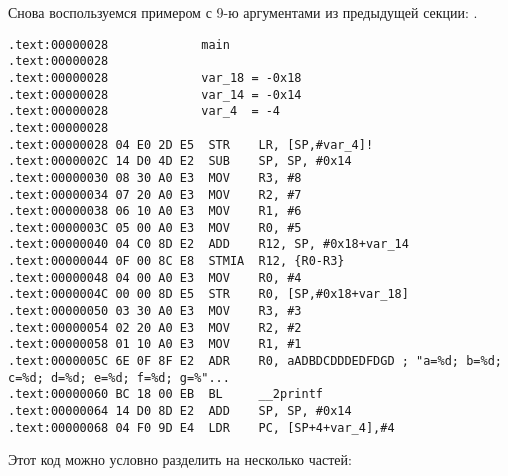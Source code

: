 
Снова воспользуемся примером с 9-ю аргументами из предыдущей секции: .



\subsubsectionold{\OptimizingKeilVI: \ARMMode}

\begin{lstlisting}
.text:00000028             main
.text:00000028
.text:00000028             var_18 = -0x18
.text:00000028             var_14 = -0x14
.text:00000028             var_4  = -4
.text:00000028
.text:00000028 04 E0 2D E5  STR    LR, [SP,#var_4]!
.text:0000002C 14 D0 4D E2  SUB    SP, SP, #0x14
.text:00000030 08 30 A0 E3  MOV    R3, #8
.text:00000034 07 20 A0 E3  MOV    R2, #7
.text:00000038 06 10 A0 E3  MOV    R1, #6
.text:0000003C 05 00 A0 E3  MOV    R0, #5
.text:00000040 04 C0 8D E2  ADD    R12, SP, #0x18+var_14
.text:00000044 0F 00 8C E8  STMIA  R12, {R0-R3}
.text:00000048 04 00 A0 E3  MOV    R0, #4
.text:0000004C 00 00 8D E5  STR    R0, [SP,#0x18+var_18]
.text:00000050 03 30 A0 E3  MOV    R3, #3
.text:00000054 02 20 A0 E3  MOV    R2, #2
.text:00000058 01 10 A0 E3  MOV    R1, #1
.text:0000005C 6E 0F 8F E2  ADR    R0, aADBDCDDDEDFDGD ; "a=%d; b=%d; c=%d; d=%d; e=%d; f=%d; g=%"...
.text:00000060 BC 18 00 EB  BL     __2printf
.text:00000064 14 D0 8D E2  ADD    SP, SP, #0x14
.text:00000068 04 F0 9D E4  LDR    PC, [SP+4+var_4],#4
\end{lstlisting}

Этот код можно условно разделить на несколько частей:

